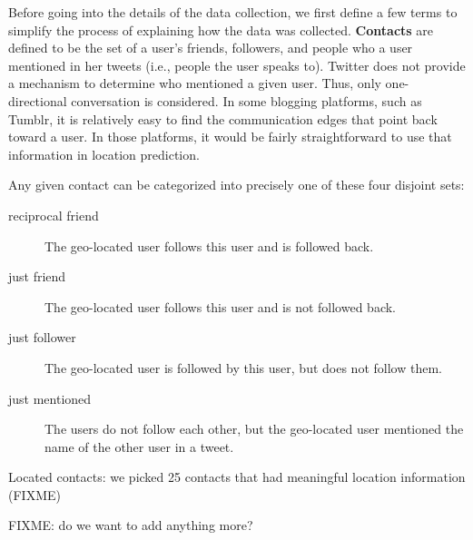 Before going into the
details of the data collection, we first define a few terms to simplify the
process of explaining how the data was collected.  \textbf{Contacts} are
defined to be the set of a user's friends, followers, and people who a user
mentioned in her tweets (i.e., people the user speaks to).  Twitter does not
provide a mechanism to determine who mentioned a given user.  Thus, only
one-directional conversation is considered.  In some blogging platforms, such
as Tumblr, it is relatively easy to find the communication edges that point
back toward a user.  In those platforms, it would be fairly straightforward to
use that information in location prediction.

Any given contact can be categorized into precisely one of these four disjoint
sets:
\begin{description}
\item[reciprocal friend] The geo-located user follows this user and is followed
    back.
\item[just friend] The geo-located user follows this user and is not followed
    back.
\item[just follower] The geo-located user is followed by this user, but does
    not follow them.
\item[just mentioned] The users do not follow each other, but the geo-located
    user mentioned the name of the other user in a tweet.
\end{description}

Located contacts: we picked 25 contacts that had meaningful location information (FIXME)

FIXME: do we want to add anything more?
